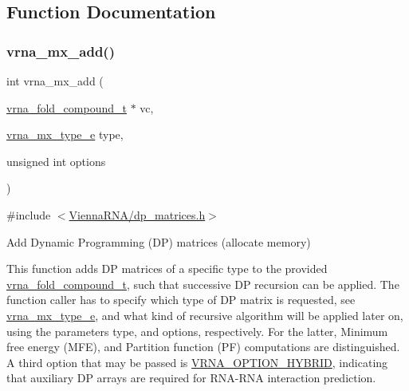\subsection{Function Documentation}
\mbox{\label{group__dp__matrices_ga08661f098008961dab0023bf300f0c33}} 
\subsubsection{\texorpdfstring{vrna\_mx\_add()}{vrna\_mx\_add()}}
{\footnotesize\ttfamily int vrna\+\_\+mx\+\_\+add (\begin{DoxyParamCaption}\item[{\mbox{\hyperlink{group__fold__compound_ga1b0cef17fd40466cef5968eaeeff6166}{vrna\+\_\+fold\+\_\+compound\+\_\+t}} $\ast$}]{vc,  }\item[{\mbox{\hyperlink{group__dp__matrices_ga6042ea1d58d01931e959791be6d89343}{vrna\+\_\+mx\+\_\+type\+\_\+e}}}]{type,  }\item[{unsigned int}]{options }\end{DoxyParamCaption})}



{\ttfamily \#include $<$\mbox{\hyperlink{dp__matrices_8h}{Vienna\+R\+N\+A/dp\+\_\+matrices.\+h}}$>$}



Add Dynamic Programming (DP) matrices (allocate memory) 

This function adds DP matrices of a specific type to the provided \mbox{\hyperlink{group__fold__compound_ga1b0cef17fd40466cef5968eaeeff6166}{vrna\+\_\+fold\+\_\+compound\+\_\+t}}, such that successive DP recursion can be applied. The function caller has to specify which type of DP matrix is requested, see \mbox{\hyperlink{group__dp__matrices_ga6042ea1d58d01931e959791be6d89343}{vrna\+\_\+mx\+\_\+type\+\_\+e}}, and what kind of recursive algorithm will be applied later on, using the parameters type, and options, respectively. For the latter, Minimum free energy (M\+FE), and Partition function (PF) computations are distinguished. A third option that may be passed is \mbox{\hyperlink{group__fold__compound_ga8f681fa12b8d4b348bf58415fd1fc82f}{V\+R\+N\+A\+\_\+\+O\+P\+T\+I\+O\+N\+\_\+\+H\+Y\+B\+R\+ID}}, indicating that auxiliary DP arrays are required for R\+N\+A-\/\+R\+NA interaction prediction.

